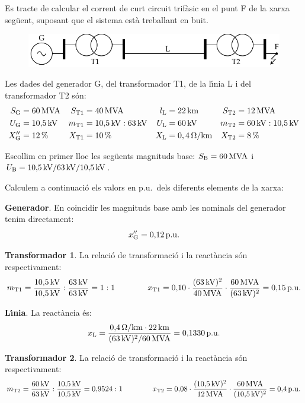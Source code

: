 \begin{exemple}

Es tracte de calcular el corrent de curt circuit trif\`{a}sic en el punt F de la xarxa seg\"{u}ent, suposant
que el sistema est\`{a} treballant en buit.
\begin{figure}[htb]
\vspace{3mm} \centering
    \includegraphics{Imatges/Cap-CalcBas-pu-Circuit1.pdf}
\end{figure}

Les dades del generador G, del transformador T1, de la l\'{\i}nia L i del transformador T2 s\'{o}n:
\begin{align*}
   S_\mathrm{G} &= 60\mathrm{\,MVA} & S_\mathrm{T1} &= 40\mathrm{\,MVA} & l_\mathrm{L} &= 22\mathrm{\,km} & S_\mathrm{T2} &= 12\mathrm{\,MVA} \\
   U_\mathrm{G} &= 10{,}5\mathrm{\,kV} & m_\mathrm{T1} &= 10{,}5\mathrm{\,kV}:63\mathrm{\,kV} & U_\mathrm{L} &= 60\mathrm{\,kV} & m_\mathrm{T2} &= 60\mathrm{\,kV}:10{,}5\mathrm{\,kV} \\
   X''_\mathrm{G} &= 12\mathrm{\,\%} & X_\mathrm{T1} &= 10\mathrm{\,\%} & X_\mathrm{L} &= 0,4\mathrm{\,\mathrm{\Omega}/km} & X_\mathrm{T2} &= 8\mathrm{\,\%}
\end{align*}

Escollim en primer lloc les seg\"{u}ents magnituds base: $S_\mathrm{B} = 60\mathrm{\,MVA}$ i $U_\mathrm{B}
= 10{,}5\mathrm{\,kV} / 63\mathrm{\,kV} / 10{,}5\mathrm{\,kV}$.

Calculem a continuaci\'{o} els valors en p.u.\ dels diferents elements de la xarxa:

\textbf{Generador}. En coincidir les magnituds base amb les nominals del generador tenim
 directament:
\[
x''_\mathrm{G} = 0{,}12\mathrm{\,p.u.}
\]

\textbf{Transformador 1}. La relaci\'{o} de transformaci\'{o} i la react\`{a}ncia s\'{o}n respectivament:
\[
m_\mathrm{T1} = \frac{10{,}5\mathrm{\,kV}}{10{,}5\mathrm{\,kV}} :
\frac{63\mathrm{\,kV}}{63\mathrm{\,kV}} = 1:1 \qquad\qquad x_\mathrm{T1} =
0{,}10 \cdot \frac{(63\mathrm{\,kV})^2}{40\mathrm{\,MVA}} \cdot
\frac{60\mathrm{\,MVA}}{(63\mathrm{\,kV})^2}  = 0{,}15\mathrm{\,p.u.}
\]

\textbf{L\'{\i}nia}. La react\`{a}ncia \'{e}s:
\[x_\mathrm{L} = \frac{0{,}4\mathrm{\,\mathrm{\Omega}/km} \cdot 22\mathrm{\,km}} {(63\mathrm{\,kV})^2/60\mathrm{\,MVA}}  = 0{,}1330\mathrm{\,p.u.}
\]

\textbf{Transformador 2}. La relaci\'{o} de transformaci\'{o} i la react\`{a}ncia s\'{o}n respectivament:
\[
m_\mathrm{T2} = \frac{60\mathrm{\,kV}}{63\mathrm{\,kV}} :
\frac{10{,}5\mathrm{\,kV}}{10{,}5\mathrm{\,kV}} = 0{,}9524:1 \qquad\qquad
x_\mathrm{T2} = 0{,}08 \cdot \frac{(10{,}5\mathrm{\,kV})^2}{12\mathrm{\,MVA}}
\cdot \frac{60\mathrm{\,MVA}}{(10{,}5\mathrm{\,kV})^2}  = 0{,}4\mathrm{\,p.u.}
\]


\end{exemple}
